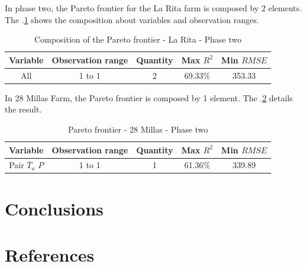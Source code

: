 \documentclass[review]{elsarticle}
\begin{document}
In phase two, the Pareto frontier for the La Rita farm is composed by 2 elements. The \tablename $.$\ref{tabla4} shows the composition about variables and observation ranges.

\begin{table}[h] 
\caption{Composition of the Pareto frontier - La Rita - Phase two} 
\label{tabla4} 
\centering
\begin{tabular}{c|c|c|c|c} 
\hline
\bfseries Variable & \bfseries Observation range & \bfseries Quantity & \bfseries Max $R^2$ & \bfseries Min $RMSE$\\ 
\hline\hline 
All & 1 to 1  & 2 & 69.33\% & 353.33 \\
\hline
\end{tabular} 
\end{table}

In 28 Millas Farm, the Pareto frontier is composed by 1 element. The \tablename $.$\ref{tabla5} details the result.

\begin{table}[h] 
\caption{Pareto frontier - 28 Millas - Phase two} 
\label{tabla5} 
\centering
\begin{tabular}{c|c|c|c|c} 
\hline
\bfseries Variable & \bfseries Observation range & \bfseries Quantity & \bfseries Max $R^2$ & \bfseries Min $RMSE$\\ 
\hline\hline 
Pair $\overline{T}_{a}$ $P$ & 1 to 1 & 1 & 61.36\% & 339.89 \\
\hline
\end{tabular} 
\end{table}

\section{Conclusions}

\section{References}
\end{document}
